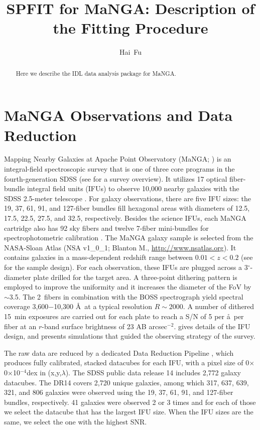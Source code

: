 \documentclass[iop,revtex4,twocolumn,apj,numberedappendix,appendixfloats]{emulateapj}
\begin{document}
\title{SPFIT for MaNGA: Description of the Fitting Procedure}

\author{
Hai~Fu 
}

\begin{abstract}
Here we describe the IDL data analysis package for MaNGA.
\end{abstract}


\section{MaNGA Observations and Data Reduction}

Mapping Nearby Galaxies at Apache Point Observatory (MaNGA; \citealt{Bundy15}) is an integral-field spectroscopic survey that is one of three core programs in the fourth-generation SDSS (see \citealt{Bundy15} for a survey overview). It utilizes 17  optical fiber-bundle integral field units (IFUs) to observe 10,000 nearby galaxies with the SDSS 2.5-meter telescope \citep{Gunn06}. For galaxy observations, there are five IFU sizes: the 19, 37, 61, 91, and 127-fiber bundles fill hexagonal areas with diameters of 12.5\arcsec, 17.5\arcsec, 22.5\arcsec, 27.5\arcsec, and 32.5\arcsec, respectively. Besides the science IFUs, each MaNGA cartridge also has 92 sky fibers and twelve 7-fiber mini-bundles for spectrophotometric calibration \citep{Yan16a}. The MaNGA galaxy sample is selected from the NASA-Sloan Atlas (NSA v1\_0\_1; Blanton M., \url{http://www.nsatlas.org}). It contains galaxies in a mass-dependent redshift range between $0.01 < z < 0.2$ (see \citet{Wake17} for the sample design). For each observation, these IFUs are plugged across a 3$^\circ$-diameter plate drilled for the target area. A three-point dithering pattern is employed to improve the uniformity and it increases the diameter of the FoV by $\sim$3.5\arcsec. The 2\arcsec\ fibers in combination with the BOSS spectrograph \citep{Smee13} yield spectral coverage 3,600$-$10,300 \AA\ at a typical resolution $R \sim 2000$. A number of dithered 15~min exposures are carried out for each plate to reach a S/N of 5 per \aa\ per fiber at an $r$-band surface brightness of 23 AB arcsec$^{-2}$. \citealt{Drory15} gives details of the IFU design, and \citet{Law15} presents simulations that guided the observing strategy of the survey. 

The raw data are reduced by a dedicated Data Reduction Pipeline \citep[DRP;][]{Law16}, which produces fully calibrated, stacked datacubes for each IFU, with a pixel size of 0$\times$0$\times$10$^{-4}$dex in (x,y,$\lambda$). The SDSS public data release 14 \citep[DR14;][]{Abolfathi17} includes 2,772 galaxy datacubes. The DR14 covers 2,720 unique galaxies, among which 317, 637, 639, 321, and 806 galaxies were observed using the 19, 37, 61, 91, and 127-fiber bundles, respectively. 41 galaxies were observed 2 or 3 times and for each of those we select the datacube that has the largest IFU size. When the IFU sizes are the same, we select the one with the highest SNR. 
\end{document}
